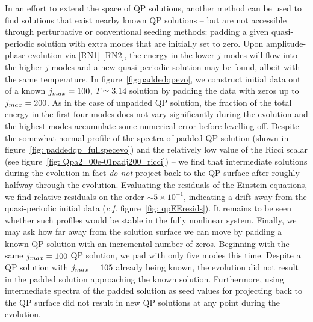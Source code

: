 \documentclass[../PhD.tex]{subfiles}
\begin{document}
In an effort to extend the space of QP solutions, another method can be used to find solutions that exist nearby known QP solutions -- but are not accessible through perturbative or conventional seeding methods: padding a given quasi-periodic solution with extra modes that are initially set to zero. Upon amplitude-phase evolution via \eqref{RN1}-\eqref{RN2}, the energy in the lower-$j$ modes will flow into the higher-$j$ modes and a new quasi-periodic solution may be found, albeit with the same temperature. In figure~\ref{fig:paddedqpevo}, we construct initial data out of a known $j_{max} = 100$, $T \simeq 3.14$ solution by padding the data with zeros up to $j_{max} = 200$. As in the case of unpadded QP solution, the fraction of the total energy in the first four modes does not vary significantly during the evolution and the highest modes accumulate some numerical error before levelling off. Despite the somewhat normal profile of the spectra of padded QP solution (shown in figure~\ref{fig: paddedqp_fullspecevo}) and the relatively low value of the Ricci scalar (see figure~\ref{fig: Qpa2_00e-01padj200_ricci}) --  we find that intermediate solutions during the evolution in fact \emph{do not} project back to the QP surface after roughly halfway through the evolution. Evaluating the residuals of the Einstein equations, we find relative residuals on the order ${\sim 5 \times 10^{-1}}$, indicating a drift away from the quasi-periodic initial data (\emph{c.f.} figure~\ref{fig: qpEEresids}). It remains to be seen whether such profiles would be stable in the fully nonlinear system. Finally, we may ask how far away from the solution surface we can move by padding a known QP solution with an incremental number of zeros. Beginning with the same $j_{max} = 100$ QP solution, we pad with only five modes this time. Despite a QP solution with $j_{max} = 105$ already being known, the evolution did not result in the padded solution approaching the known solution. Furthermore, using intermediate spectra of the padded solution as seed values for projecting back to the QP surface did not result in new QP solutions at any point during the evolution.
\end{document}
